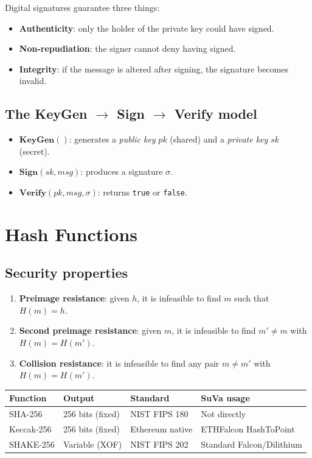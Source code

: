 \documentclass[11pt,a4paper]{article}
\begin{document}
Digital signatures guarantee three things:
\begin{itemize}
  \item \textbf{Authenticity}: only the holder of the private key could have signed.
  \item \textbf{Non-repudiation}: the signer cannot deny having signed.
  \item \textbf{Integrity}: if the message is altered after signing, the signature becomes invalid.
\end{itemize}

\subsection{The KeyGen $\to$ Sign $\to$ Verify model}

\begin{itemize}
  \item $\mathbf{KeyGen}()$: generates a \emph{public key} $pk$ (shared) and a \emph{private key} $sk$ (secret).
  \item $\mathbf{Sign}(sk, msg)$: produces a signature $\sigma$.
  \item $\mathbf{Verify}(pk, msg, \sigma)$: returns \texttt{true} or \texttt{false}.
\end{itemize}

\section{Hash Functions}

\subsection{Security properties}

\begin{enumerate}
  \item \textbf{Preimage resistance}: given $h$, it is infeasible to find $m$ such that $H(m) = h$.
  \item \textbf{Second preimage resistance}: given $m$, it is infeasible to find $m' \neq m$ with $H(m) = H(m')$.
  \item \textbf{Collision resistance}: it is infeasible to find any pair $m \neq m'$ with $H(m) = H(m')$.
\end{enumerate}

\begin{center}
\begin{tabular}{llll}
\toprule
\textbf{Function} & \textbf{Output} & \textbf{Standard} & \textbf{SuVa usage} \\
\midrule
SHA-256    & 256 bits (fixed) & NIST FIPS 180 & Not directly \\
Keccak-256 & 256 bits (fixed) & Ethereum native & ETHFalcon HashToPoint \\
SHAKE-256  & Variable (XOF)   & NIST FIPS 202  & Standard Falcon/Dilithium \\
\bottomrule
\end{tabular}
\end{center}
\end{document}
